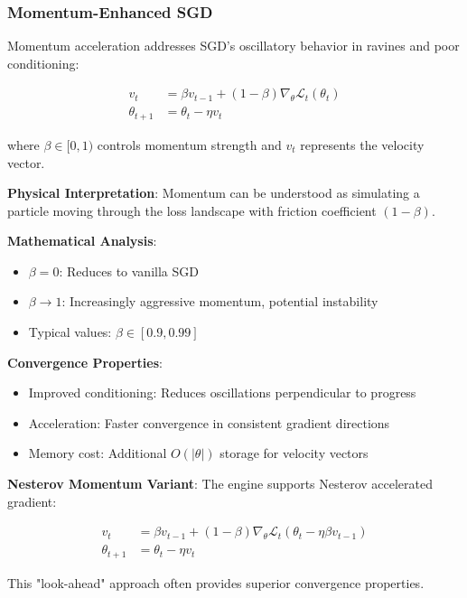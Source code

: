 \documentclass[11pt,a4paper]{report}
\begin{document}
\subsubsection{Momentum-Enhanced SGD}

Momentum acceleration addresses SGD's oscillatory behavior in ravines and poor conditioning:

\begin{align}
v_t &= \beta v_{t-1} + (1 - \beta) \nabla_\theta \mathcal{L}_t(\theta_t) \\
\theta_{t+1} &= \theta_t - \eta v_t
\end{align}

where $\beta \in [0, 1)$ controls momentum strength and $v_t$ represents the velocity vector.

\textbf{Physical Interpretation}: Momentum can be understood as simulating a particle moving through the loss landscape with friction coefficient $(1 - \beta)$.

\textbf{Mathematical Analysis}: 
\begin{itemize}
\item $\beta = 0$: Reduces to vanilla SGD
\item $\beta \rightarrow 1$: Increasingly aggressive momentum, potential instability
\item Typical values: $\beta \in [0.9, 0.99]$
\end{itemize}

\textbf{Convergence Properties}:
\begin{itemize}
\item Improved conditioning: Reduces oscillations perpendicular to progress
\item Acceleration: Faster convergence in consistent gradient directions
\item Memory cost: Additional $O(|\theta|)$ storage for velocity vectors
\end{itemize}

\textbf{Nesterov Momentum Variant}: The engine supports Nesterov accelerated gradient:

\begin{align}
v_t &= \beta v_{t-1} + (1 - \beta) \nabla_\theta \mathcal{L}_t(\theta_t - \eta \beta v_{t-1}) \\
\theta_{t+1} &= \theta_t - \eta v_t
\end{align}

This "look-ahead" approach often provides superior convergence properties.
\end{document}
